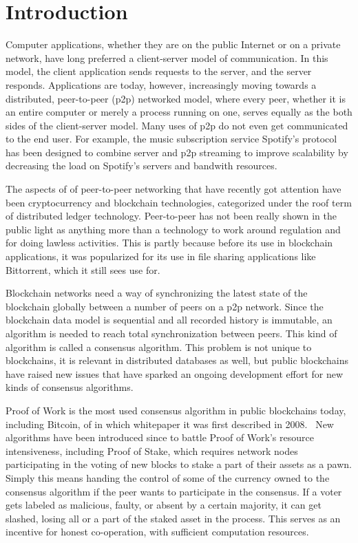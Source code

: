 \chapter{Introduction}
\label{Introduction}

Computer applications, whether they are on the public Internet or on a private network, have long preferred a client-server model of communication. In this model, the client application sends requests to the server, and the server responds. Applications are today, however, increasingly moving towards a distributed, peer-to-peer (p2p) networked model, where every peer, whether it is an entire computer or merely a process running on one, serves equally as the both sides of the client-server model. Many uses of p2p do not even get communicated to the end user. For example, the music subscription service Spotify's protocol has been designed to combine server and p2p streaming to improve scalability by decreasing the load on Spotify's servers and bandwith resources.\cite{Kreitz_undated-yp} 

The aspects of of peer-to-peer networking that have recently got attention have been cryptocurrency and blockchain technologies, categorized under the roof term of distributed ledger technology. Peer-to-peer has not been really shown in the public light as anything more than a technology to work around regulation and for doing lawless activities. This is partly because before its use in blockchain applications, it was popularized for its use in file sharing applications like Bittorrent, which it still sees use for. 

Blockchain networks need a way of synchronizing the latest state of the blockchain globally between a number of peers on a p2p network. Since the blockchain data model is sequential and all recorded history is immutable, an algorithm is needed to reach total synchronization between peers. This kind of algorithm is called a consensus algorithm. This problem is not unique to blockchains, it is relevant in distributed databases as well, but public blockchains have raised new issues that have sparked an ongoing development effort for new kinds of consensus algorithms.

Proof of Work is the most used consensus algorithm in public blockchains today, including Bitcoin, of in which whitepaper it was first described in 2008.~\cite{Nakamoto2019-ax} New algorithms have been introduced since to battle Proof of Work's resource intensiveness, including Proof of Stake, which requires network nodes participating in the voting of new blocks to stake a part of their assets as a pawn. Simply this means handing the control of some of the currency owned to the consensus algorithm if the peer wants to participate in the consensus. If a voter gets labeled as malicious, faulty, or absent by a certain majority, it can get slashed, losing all or a part of the staked asset in the process. This serves as an incentive for honest co-operation, with sufficient computation resources.

